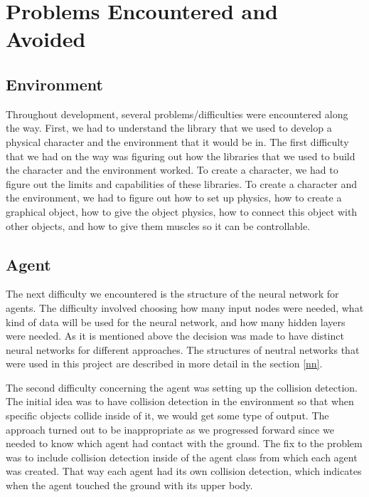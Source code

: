\documentclass[letterpaper]{article} %
\begin{document}
\section{Problems Encountered and Avoided}

\subsection{Environment}
Throughout development, several problems/difficulties were encountered along the way. First, we had to understand the library that we used to develop a physical character and the environment that it would be in. The first difficulty that we had on the way was figuring out how the libraries that we used to build the character and the environment worked. To create a character, we had to figure out the limits and capabilities of these libraries. To create a character and the environment, we had to figure out how to set up physics, how to create a graphical object, how to give the object physics, how to connect this object with other objects, and how to give them muscles so it can be controllable. 

\subsection{Agent}

The next difficulty we encountered is the structure of the neural network for agents. The difficulty involved choosing how many input nodes were needed, what kind of data will be used for the neural network, and how many hidden layers were needed. As it is mentioned above the decision was made to have distinct neural networks for different approaches. The structures of neutral networks that were used in this project are described in more detail in the section \ref{nn}.

\par The second difficulty concerning the agent was setting up the collision detection. The initial idea was to have collision detection in the environment so that when specific objects collide inside of it, we would get some type of output. The approach turned out to be inappropriate as we progressed forward since we needed to know which agent had contact with the ground. The fix to the problem was to include collision detection inside of the agent class from which each agent was created. That way each agent had its own collision detection, which indicates when the agent touched the ground with its upper body.
\end{document}

